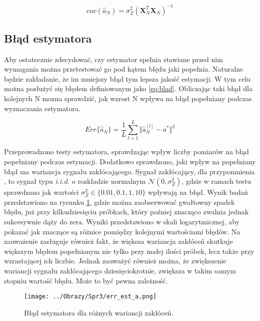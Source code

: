 \documentclass[12pt,a4paper]{article}
\begin{document}
\begin{equation}\label{eq:mac_kow}
cov(\hat{a}_{N}) = \sigma_{Z}^{2}(\textbf{X}_N^{T}\textbf{X}_N)^{-1}
\end{equation}


\subsection{Błąd estymatora}
Aby ostatecznie zdecydować, czy estymator spełnia stawiane przed nim wymagania można przetestować go pod kątem błędu jaki popełnia.
Naturalne będzie zakładanie, że im mniejszy błąd tym lepsza jakość estymacji.
W tym celu można posłużyć się błędem definiowanym jako \ref{eq:blad}.
Obliczając taki błąd dla kolejnych N mozna sprawdzić, jak wzrost N wpływa na błąd popełniany podczas wyznaczania estymatora.

\begin{equation}\label{eq:blad}
Err\{\hat{a}_{N}\}=\frac{1}{L}\sum_{l=1}^{L}\Vert\hat{a}_{N}^{[l]}-a^{*}\Vert^{2}
\end{equation}

Przeprowadzono testy estymatora, sprawdzając wpływ liczby pomiarów na błąd popełniany podczas estymacji. Dodatkowo sprawdzono, jaki wpływ na popełniany błąd ma wariancja sygnału zakłócającego.
Sygnał zakłócający, dla przypomnienia , to sygnał typu \textit{i.i.d.} o rozkładzie normalnym $\mathcal{N}(0,\sigma_{Z}^{2})$, gdzie w ramach testu sprawdzano jak wartości $\sigma_{Z}^{2} \in \{0.01,0.1,1,10\}$ wpływają na błąd.
Wynik badań przedstawiono na rysunku \ref{fig:blad}, gdzie można zaobserwować gwałtowny spadek błędu, już przy kilkudziesięciu próbkach, który poźniej znacząco zwalnia jednak sukcesywnie dąży do zera. Wyniki przedstawiono w skali logarytmicznej, aby pokazać jak znaczące są różnice pomiędzy kolejnymi wartościami błędów.
Na zauważenie zasługuje również fakt, że większa wariancja zakłóceń skutkuje większym błędem popełnianym nie tylko przy małej ilości próbek, lecz także przy wzrastającej ich liczbie.
Jednak zauważyć również można, że zwiększenie wariancji sygnału zakłócającego dziesięciokrotnie, zwiększa w takim samym stopniu wartość błędu. Może to być pewna zależność.

\begin{figure}[H]
\centering
\texttt{[image: ../Obrazy/Spr3/err\_est\_a.png]} 
\caption{Błąd estymatora dla różnych wariancji zakłóceń.}
\label{fig:blad}
\end{figure}

\newpage
\end{document}
